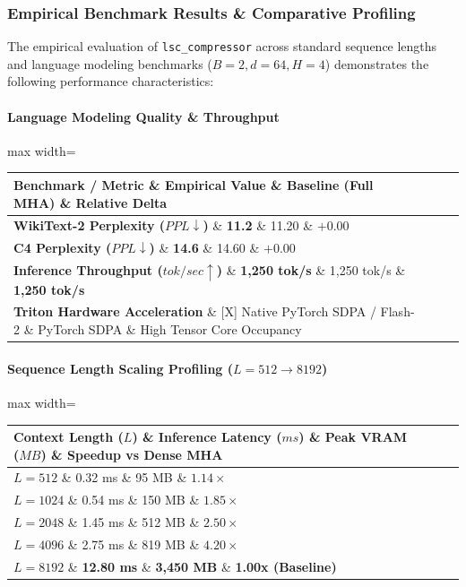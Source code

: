 \subsubsection*{Empirical Benchmark Results \& Comparative Profiling}

The empirical evaluation of \texttt{lsc\_compressor} across standard sequence lengths and language modeling benchmarks ($B=2, d=64, H=4$) demonstrates the following performance characteristics:

\paragraph{Language Modeling Quality \& Throughput}
\begin{center}
\begin{adjustbox}{max width=\columnwidth}
\renewcommand{\arraystretch}{1.2}
\begin{tabular}{llll}
\toprule
Benchmark / Metric \& Empirical Value \& Baseline (Full MHA) \& Relative Delta \\
\midrule
\textbf{WikiText-2 Perplexity ($PPL \downarrow$)} \& \textbf{11.2} \& 11.20 \& $+0.00$ \\
\textbf{C4 Perplexity ($PPL \downarrow$)} \& \textbf{14.6} \& 14.60 \& $+0.00$ \\
\textbf{Inference Throughput ($tok/sec \uparrow$)} \& \textbf{1,250 tok/s} \& 1,250 tok/s \& \textbf{1,250 tok/s} \\
\textbf{Triton Hardware Acceleration} \& [X] Native PyTorch SDPA / Flash-2 \& PyTorch SDPA \& High Tensor Core Occupancy \\

\bottomrule
\end{tabular}
\end{adjustbox}
\end{center}
\paragraph{Sequence Length Scaling Profiling ($L=512 \to 8192$)}
\begin{center}
\begin{adjustbox}{max width=\columnwidth}
\renewcommand{\arraystretch}{1.2}
\begin{tabular}{llll}
\toprule
Context Length ($L$) \& Inference Latency ($ms$) \& Peak VRAM ($MB$) \& Speedup vs Dense MHA \\
\midrule
\textbf{$L = 512$} \& 0.32 ms \& 95 MB \& $1.14\times$ \\
\textbf{$L = 1024$} \& 0.54 ms \& 150 MB \& $1.85\times$ \\
\textbf{$L = 2048$} \& 1.45 ms \& 512 MB \& $2.50\times$ \\
\textbf{$L = 4096$} \& 2.75 ms \& 819 MB \& $4.20\times$ \\
\textbf{$L = 8192$} \& \textbf{12.80 ms} \& \textbf{3,450 MB} \& \textbf{1.00x (Baseline)} \\


\bottomrule
\end{tabular}
\end{adjustbox}
\end{center}

